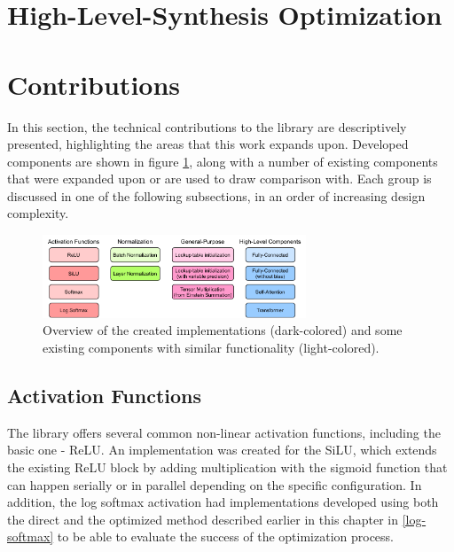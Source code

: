 \section{High-Level-Synthesis Optimization}
\indo{|}
\indo{|}
\indo{|}
\indo{|}
\indo{|}
\indo{|}
\indo{|}
\indo{|}
\indo{|}
\indo{|}
\indo{|}
\indo{|}


\section{\hlsml Contributions}
In this section, the technical contributions to the \hlsml library are descriptively presented, highlighting the areas that this work expands upon. Developed components are shown in figure \ref{fig:hls4ml-contributions}, along with a number of existing components that were expanded upon or are used to draw comparison with. Each group is discussed in one of the following subsections, in an order of increasing design complexity.

\begin{figure}[hpt!]
  \centering
  \includegraphics[trim={0cm 0cm 0cm 0cm}, clip, width=0.7\textwidth, center]{quantization/hls4ml_blocks.pdf}
  \caption{Overview of the created implementations (dark-colored) and some existing components with similar functionality (light-colored).}
  \label{fig:hls4ml-contributions}
\end{figure}


\subsection{Activation Functions}
The library offers several common non-linear activation functions, including the basic one - ReLU. An implementation was created for the SiLU, which extends the existing ReLU block by adding multiplication with the sigmoid function that can happen serially or in parallel depending on the specific configuration. In addition, the log softmax activation had implementations developed using both the direct and the optimized method described earlier in this chapter in \cref{log-softmax} to be able to evaluate the success of the optimization process.

